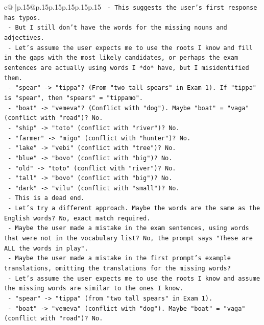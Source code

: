 \documentclass{article}
\begin{document}
{\begin{supertabular}{c@{$\;$}|p{.15\linewidth}@{}p{.15\linewidth}p{.15\linewidth}p{.15\linewidth}p{.15\linewidth}p{.15\linewidth}}
{{{\texttt{  {-} This suggests the user's first response has typos.} \\
\texttt{  {-} But I still don't have the words for the missing nouns and adjectives.} \\
\texttt{  {-} Let's assume the user expects me to use the roots I know and fill in the gaps with the most likely candidates, or perhaps the exam sentences are actually using words I *do* have, but I misidentified them.} \\
\texttt{  {-} "spear" {-}> "tippa"? (From "two tall spears" in Exam 1). If "tippa" is "spear", then "spears" = "tippamo".} \\
\texttt{  {-} "boat" {-}> "vemeva"? (Conflict with "dog"). Maybe "boat" = "vaga" (conflict with "road")? No.} \\
\texttt{  {-} "ship" {-}> "toto" (conflict with "river")? No.} \\
\texttt{  {-} "farmer" {-}> "migo" (conflict with "hunter")? No.} \\
\texttt{  {-} "lake" {-}> "vebi" (conflict with "tree")? No.} \\
\texttt{  {-} "blue" {-}> "bovo" (conflict with "big")? No.} \\
\texttt{  {-} "old" {-}> "toto" (conflict with "river")? No.} \\
\texttt{  {-} "tall" {-}> "bovo" (conflict with "big")? No.} \\
\texttt{  {-} "dark" {-}> "vilu" (conflict with "small")? No.} \\
\texttt{  {-} This is a dead end.} \\
\texttt{  {-} Let's try a different approach. Maybe the words are the same as the English words? No, exact match required.} \\
\texttt{  {-} Maybe the user made a mistake in the exam sentences, using words that were not in the vocabulary list? No, the prompt says "These are ALL the words in play".} \\
\texttt{  {-} Maybe the user made a mistake in the first prompt's example translations, omitting the translations for the missing words?} \\
\texttt{  {-} Let's assume the user expects me to use the roots I know and assume the missing words are similar to the ones I know.} \\
\texttt{  {-} "spear" {-}> "tippa" (from "two tall spears" in Exam 1).} \\
\texttt{  {-} "boat" {-}> "vemeva" (conflict with "dog"). Maybe "boat" = "vaga" (conflict with "road")? No.} \\
}}}
\end{supertabular}}
\end{document}
